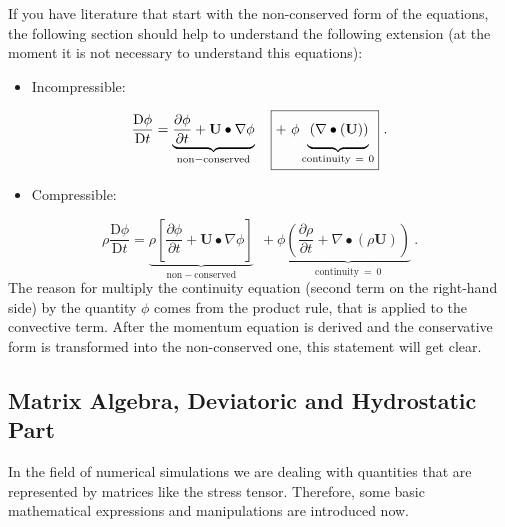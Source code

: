 	If you have literature that start with the non-conserved form of the
    equations, the following section should help to understand the following
    extension (at the moment it is not necessary to understand this equations):
%
%
\begin{itemize}
    \item Incompressible:
\end{itemize}
%
%
\begin{equation}
    \frac{\mathrm{D}\phi}{\mathrm{D}t}
=
    \underbrace{\frac{\partial \phi}{\partial t} + \textbf{U}\bullet \nabla \phi}_{\mathrm{non-conserved}}
 ~~~ \boxed{ + ~
    \phi \underbrace{\vphantom{\frac{1}{2}}\left( \nabla \bullet (\textbf{U})\right)}_{\mathrm{continuity~=~0}}} ~.
\end{equation}
%
%
\begin{itemize}
    \item Compressible:
\end{itemize}
%
%
\begin{equation}
   \rho \frac{\mathrm{D}\phi}{\mathrm{D}t}
=
    \underbrace{\rho\left[\frac{\partial \phi}{\partial t} + \textbf{U}\bullet \nabla \phi\right]}_{\mathrm{non-conserved}}
 ~~~ \boxed{ + ~
    \phi \underbrace{\left( \frac{\partial \rho}{\partial t} + \nabla \bullet (\rho \textbf{U})\right)}_{\mathrm{continuity~=~0}}} ~.
\end{equation}
%
%
	The reason for multiply the continuity equation (second term on the
    right-hand side) by the quantity $\phi$ comes from the product rule,
    that is applied to the convective term. After the momentum equation is
    derived and the conservative form is transformed into the non-conserved
    one, this statement will get clear.
%
%
%
%
\subsection{Matrix Algebra, Deviatoric and Hydrostatic Part}
%
%
	In the field of numerical simulations we are dealing with quantities that
    are represented by matrices like the stress tensor. Therefore, some basic
    mathematical expressions and manipulations are introduced now.


